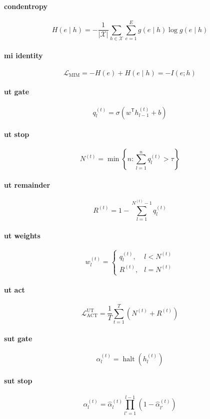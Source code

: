 \documentclass{article}
\begin{document}
\paragraph{condentropy}
\[
H(e\mid h)=-\frac{1}{|\mathcal{X}|}\sum_{h\in\mathcal{X}}\sum_{e=1}^{E}g(e\mid h)\log g(e\mid h)
\]

\paragraph{mi identity}
\[
\mathcal{L}_{\mathrm{MIM}}=-H(e)+H(e\mid h)=-I(e;h)
\]

\paragraph{ut gate}
\[
q_l^{(t)}=\sigma\!\left(w^{\mathsf T}h_{l-1}^{(t)}+b\right)
\]

\paragraph{ut stop}
\[
N^{(t)}=\min\!\left\{n:\sum_{l=1}^{n}q_l^{(t)}>\tau\right\}
\]

\paragraph{ut remainder}
\[
R^{(t)}=1-\sum_{l=1}^{N^{(t)}-1}q_l^{(t)}
\]

\paragraph{ut weights}
\[
w_l^{(t)}=\begin{cases}q_l^{(t)},&l<N^{(t)}\\R^{(t)},&l=N^{(t)}\end{cases}
\]

\paragraph{ut act}
\[
\mathcal{L}_{\mathrm{ACT}}^{\mathrm{UT}}=\frac{1}{T}\sum_{t=1}^{T}\left(N^{(t)}+R^{(t)}\right)
\]

\paragraph{sut gate}
\[
\hat\alpha_l^{(t)}=\operatorname{halt}\!\left(h_l^{(t)}\right)
\]

\paragraph{sut stop}
\[
\alpha_l^{(t)}=\hat\alpha_l^{(t)}\prod_{l'=1}^{l-1}\left(1-\hat\alpha_{l'}^{(t)}\right)
\]
\end{document}
